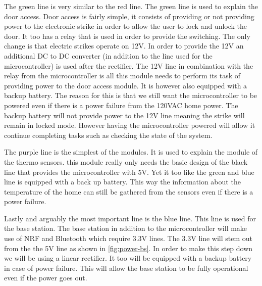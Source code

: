  
The green line is very similar to the red line. The green line is used to
explain the door access. Door access is fairly simple, it consists of providing
or not providing power to the electronic strike in order to allow the user to
lock and unlock the door. It too has a relay that is used in order to provide
the switching. The only change is that electric strikes operate on 12V. In
order to provide the 12V an additional DC to DC converter (in addition to the
line used for the microcontroller) is used after the rectifier. The 12V line in
combination with the relay from the microcontroller is all this module needs to
perform its task of providing power to the door access module. It is however
also equipped with a backup battery. The reason for this is that we still want
the microcontroller to be powered even if there is a power failure from the
120VAC home power. The backup battery will not provide power to the 12V line
meaning the strike will remain in locked mode. However having the
microcontroller powered will allow it continue completing tasks such as
checking the state of the system.


The purple line is the simplest of the modules. It is used to explain the
module of the thermo sensors. this module really only needs the basic design of
the black line that provides the microcontroller with 5V. Yet it too like the
green and blue line is equipped with a back up battery. This way the
information about the temperature of the home can still be gathered from the
sensors even if there is a power failure.


Lastly and arguably the most important line is the blue line.
This line is used for the base station. The base station in addition to the
microcontroller will make use of NRF and Bluetooth which require 3.3V lines.
The 3.3V line will stem out from the the 5V line as shown in \autoref{fig:power-bs}.
In order to make this step down we will be using a linear rectifier. It
too will be equipped with a backup battery in case of power failure. This will
allow the base station to be fully operational even if the power goes out.

